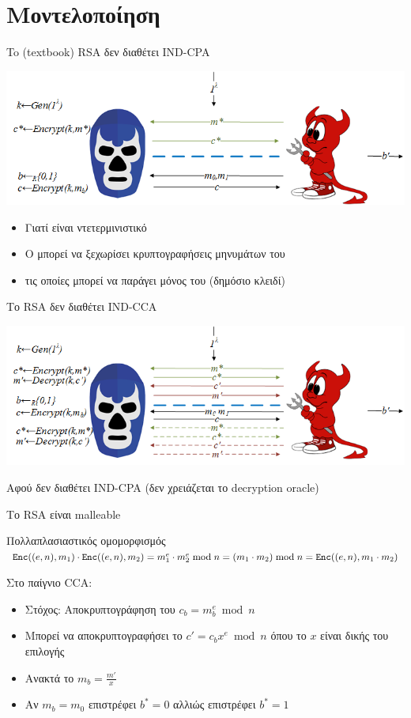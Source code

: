 \documentclass[handout]{beamer}
\begin{document}
\section{Μοντελοποίηση}
\begin{frame}{To (textbook) RSA δεν διαθέτει IND-CPA}
\begin{center}
\includegraphics[scale=0.6]{ind-cpa.png}  
\end{center}

\begin{itemize}
\item Γιατί είναι ντετερμινιστικό \pause
\item Ο \adv μπορεί να ξεχωρίσει κρυπτογραφήσεις μηνυμάτων του
\item τις οποίες μπορεί να παράγει μόνος του (δημόσιο κλειδί)
\end{itemize} 
\end{frame}

\begin{frame}{Το RSA δεν διαθέτει IND-CCA}
\begin{center}
\includegraphics[scale=0.6]{ind-cca.png}  
\end{center}
Αφού δεν διαθέτει IND-CPA (δεν χρειάζεται το decryption oracle)
\end{frame}

\begin{frame}{Το RSA είναι malleable}
\begin{block}{Πολλαπλασιαστικός ομομορφισμός}
		$\mathtt{Enc}((e,n),m_1) \cdot \mathtt{Enc}((e,n),m_2) = m_1^e \cdot m_2^e \bmod{n} = (m_1 \cdot m_2) \bmod{n} = \mathtt{Enc}((e,n),m_1 \cdot m_2)$
\end{block}
\pause
Στο παίγνιο CCA:
\begin{itemize}
\item Στόχος: Αποκρυπτογράφηση του $c_b = m_b^e \bmod{n}$
\item Μπορεί να αποκρυπτογραφήσει το $ c'= c_b x^e \bmod{n}$ όπου το $x$ είναι δικής του επιλογής
\item Ανακτά το $m_b = \frac{m'}{x}$ 
\item Αν $m_b = m_0$ επιστρέφει $b^*=0$ αλλιώς επιστρέφει $b^*=1$
\end{itemize} 
\end{frame}
\end{document}
